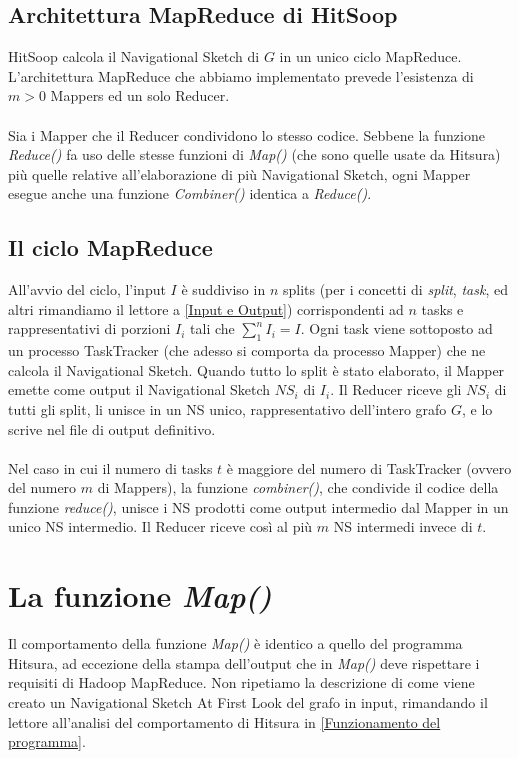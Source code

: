 \documentclass[a4paper,11pt]{report}
\begin{document}
\subsection{Architettura MapReduce di HitSoop}
HitSoop calcola il Navigational Sketch di $G$ in un unico ciclo MapReduce.  L'architettura MapReduce che abbiamo implementato prevede
l'esistenza di $m>0$ Mappers ed un solo Reducer.
\paragraph{}
Sia i Mapper che il Reducer condividono lo stesso codice. Sebbene la funzione \emph{Reduce()} fa uso delle stesse funzioni di \emph{Map()}
(che sono quelle usate da Hitsura) più quelle relative
all'elaborazione di più Navigational Sketch, ogni Mapper esegue anche una funzione \emph{Combiner()} identica a \emph{Reduce()}. 

\subsection{Il ciclo MapReduce}
All'avvio del ciclo, l'input $I$ è suddiviso in $n$ splits (per i concetti di \emph{split}, \emph{task}, ed altri rimandiamo il lettore a
\ref{Input e Output}) corrispondenti ad $n$ tasks e rappresentativi di porzioni
 $I_i$ tali che \mbox{$\sum_1^n I_i=I$}. Ogni task viene sottoposto ad un processo TaskTracker (che adesso si comporta da processo Mapper)
che ne calcola il Navigational Sketch. 
Quando tutto lo split è stato elaborato, il Mapper emette come output il Navigational Sketch $NS_i$ di $I_i$.
Il Reducer riceve gli $NS_i$ di tutti gli split, li unisce in un NS unico, rappresentativo dell'intero grafo $G$, e lo scrive nel file di
output definitivo. 
\paragraph{}
Nel caso in cui il numero di tasks $t$ è maggiore del numero di TaskTracker (ovvero del numero $m$ di Mappers), la funzione
\emph{combiner()}, che condivide il codice della funzione
\emph{reduce()}, unisce i NS prodotti come output intermedio dal Mapper in un unico NS intermedio. Il Reducer riceve così al più $m$ NS
intermedi invece di $t$.

\section{La funzione \emph{Map()}}
Il comportamento della funzione \emph{Map()} è identico a quello del programma Hitsura, ad eccezione della stampa dell'output che in
\emph{Map()} deve rispettare
i requisiti di Hadoop MapReduce. Non ripetiamo la descrizione di come viene creato un Navigational Sketch At First Look del grafo in input,
rimandando il lettore all'analisi del comportamento di Hitsura in \ref{Funzionamento del programma}.
\end{document}
